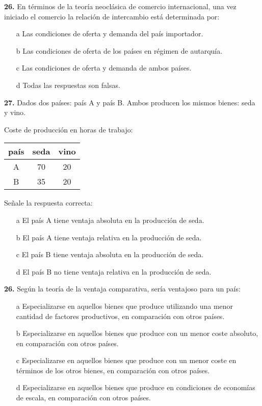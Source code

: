 \documentclass{nuevotema}
\begin{document}

\textbf{26.} En términos de la teoría neoclásica de comercio internacional, una vez iniciado el comercio la relación de intercambio está determinada por:

\begin{enumerate}
	\item[a] Las condiciones de oferta y demanda del país importador.
	\item[b] Las condiciones de oferta de los países en régimen de autarquía.
	\item[c] Las condiciones de oferta y demanda de ambos países.
	\item[d] Todas las respuestas son falsas.
\end{enumerate}

\textbf{27.} Dados dos países: país A y país B. Ambos producen los mismos bienes: seda y vino.

\medskip

Coste de producción en horas de trabajo:

\begin{tabular}{c | c | c}
\textbf{país} & \textbf{seda} & \textbf{vino} \\ \hline
A & 70 & 20 \\ \hline
B & 35 & 20 \\ \hline	
\end{tabular}
	
\medskip

Señale la respuesta correcta:
	
\begin{enumerate}
	\item[a] El país A tiene ventaja absoluta en la producción de seda.
	\item[b] El país A tiene ventaja relativa en la producción de seda.
	\item[c] El país B tiene ventaja absoluta en la producción de seda.
	\item[d] El país B no tiene ventaja relativa en la producción de seda.
\end{enumerate}


\textbf{26.} Según la teoría de la ventaja comparativa, sería ventajoso para un país:

\begin{enumerate}
	\item[a] Especializarse en aquellos bienes que produce utilizando una menor cantidad de factores productivos, en comparación con otros países.
	\item[b] Especializarse en aquellos bienes que produce con un menor coste absoluto, en comparación con otros países.
	\item[c] Especializarse en aquellos bienes que produce con un menor coste en términos de los otros bienes, en comparación con otros países.
	\item[d] Especializarse en aquellos bienes que produce en condiciones de economías de escala, en comparación con otros países.
\end{enumerate}
\end{document}
